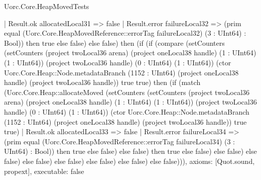 \begin{lexlean}{Uorc.Core.HeapMovedTests}
\begin{semanticmodule}
{        | Result.ok allocatedLocal31 => false
        | Result.error failureLocal32 => (prim equal (Uorc.Core.HeapMovedReference::errorTag failureLocal32) (3 : UInt64) : Bool)) then true else false) else false) then (if (if (compare (setCounters (setCounters (project twoLocal36 arena) (project oneLocal38 handle) (1 : UInt64) (1 : UInt64)) (project twoLocal36 handle) (0 : UInt64) (1 : UInt64)) (ctor Uorc.Core.Heap::Node.metadataBranch (1152 : UInt64) (project oneLocal38 handle) (project twoLocal36 handle)) true true) then (if (match (Uorc.Core.Heap::allocateMoved (setCounters (setCounters (project twoLocal36 arena) (project oneLocal38 handle) (1 : UInt64) (1 : UInt64)) (project twoLocal36 handle) (0 : UInt64) (1 : UInt64)) (ctor Uorc.Core.Heap::Node.metadataBranch (1152 : UInt64) (project oneLocal38 handle) (project twoLocal36 handle)) true true)
        | Result.ok allocatedLocal33 => false
        | Result.error failureLocal34 => (prim equal (Uorc.Core.HeapMovedReference::errorTag failureLocal34) (3 : UInt64) : Bool)) then true else false) else false) then true else false) else false) else false) else false) else false) else false) else false) else false))),
  axioms: [Quot.sound, propext],
  executable: false
}


\end{semanticmodule}
\end{lexlean}
